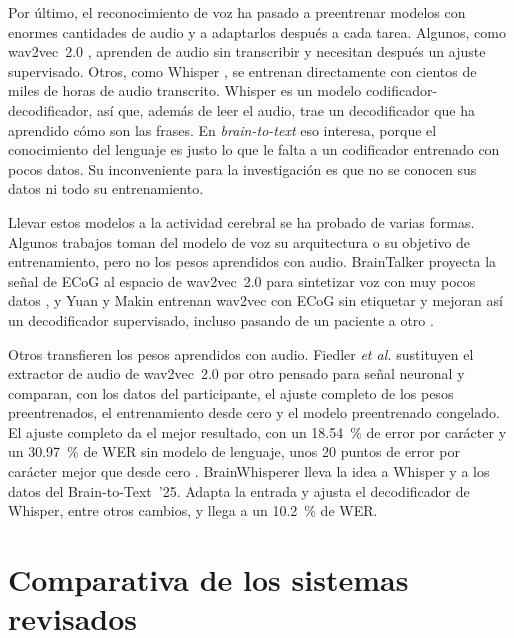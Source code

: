 Por último, el reconocimiento de voz ha pasado a preentrenar modelos con enormes cantidades de audio y a adaptarlos después a cada tarea. Algunos, como wav2vec~2.0 \cite{baevski2020wav2vec}, aprenden de audio sin transcribir y necesitan después un ajuste supervisado. Otros, como Whisper \cite{radford2023whisper}, se entrenan directamente con cientos de miles de horas de audio transcrito. Whisper es un modelo codificador-decodificador, así que, además de leer el audio, trae un decodificador que ha aprendido cómo son las frases. En \textit{brain-to-text} eso interesa, porque el conocimiento del lenguaje es justo lo que le falta a un codificador entrenado con pocos datos. Su inconveniente para la investigación es que no se conocen sus datos ni todo su entrenamiento. 


Llevar estos modelos a la actividad cerebral se ha probado de varias formas. Algunos trabajos toman del modelo de voz su arquitectura o su objetivo de entrenamiento, pero no los pesos aprendidos con audio. BrainTalker proyecta la señal de ECoG al espacio de wav2vec~2.0 para sintetizar voz con muy pocos datos \cite{braintalker}, y Yuan y Makin entrenan wav2vec con ECoG sin etiquetar y mejoran así un decodificador supervisado, incluso pasando de un paciente a otro \cite{ecogssl2024}.

Otros transfieren los pesos aprendidos con audio. Fiedler \textit{et al.} sustituyen el extractor de audio de wav2vec~2.0 por otro pensado para señal neuronal y comparan, con los datos del participante, el ajuste completo de los pesos preentrenados, el entrenamiento desde cero y el modelo preentrenado congelado. El ajuste completo da el mejor resultado, con un \SI{18.54}{\percent} de error por carácter y un \SI{30.97}{\percent} de WER sin modelo de lenguaje, unos 20 puntos de error por carácter mejor que desde cero \cite{fiedler2025wav2vec2brain}. BrainWhisperer lleva la idea a Whisper y a los datos del Brain-to-Text~'25. Adapta la entrada y ajusta el decodificador de Whisper, entre otros cambios, y llega a un \SI{10.2}{\percent} de WER.

\section{Comparativa de los sistemas revisados}
\label{sec:sota-resumen}

